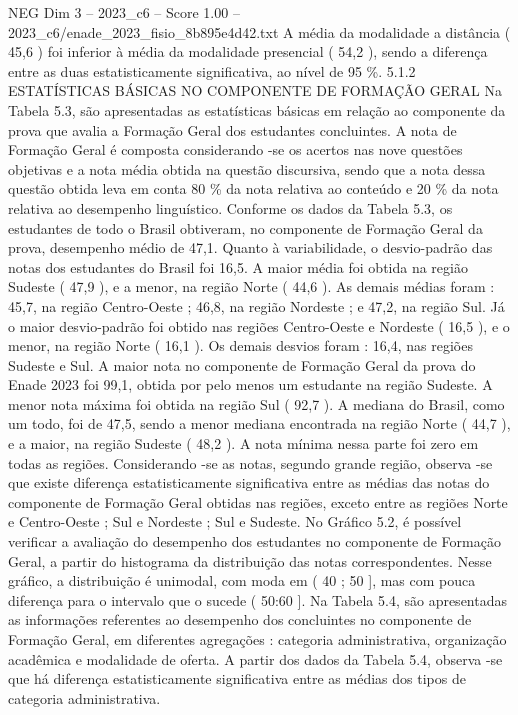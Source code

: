 \begin{textsample}{NEG Dim 3 – 2023\_c6 – Score 1.00 – 2023\_c6/enade\_2023\_fisio\_8b895e4d42.txt}
A média da modalidade a distância ( 45,6 ) foi inferior à média da modalidade presencial ( 54,2 ), sendo a diferença entre as duas estatisticamente significativa, ao nível de 95 \%. 5.1.2 ESTATÍSTICAS BÁSICAS NO COMPONENTE DE FORMAÇÃO GERAL Na Tabela 5.3, são apresentadas as estatísticas básicas em relação ao componente da prova que avalia a Formação Geral dos estudantes concluintes.
A nota de Formação Geral é composta considerando -se os acertos nas nove questões objetivas e a nota média obtida na questão discursiva, sendo que a nota dessa questão obtida leva em conta 80 \% da nota relativa ao conteúdo e 20 \% da nota relativa ao desempenho linguístico.
Conforme os dados da Tabela 5.3, os estudantes de todo o Brasil obtiveram, no componente de Formação Geral da prova, desempenho médio de 47,1.
Quanto à variabilidade, o desvio-padrão das notas dos estudantes do Brasil foi 16,5.
A maior média foi obtida na região Sudeste ( 47,9 ), e a menor, na região Norte ( 44,6 ).
As demais médias foram : 45,7, na região Centro-Oeste ; 46,8, na região Nordeste ; e 47,2, na região Sul.
Já o maior desvio-padrão foi obtido nas regiões Centro-Oeste e Nordeste ( 16,5 ), e o menor, na região Norte ( 16,1 ).
Os demais desvios foram : 16,4, nas regiões Sudeste e Sul.
A maior nota no componente de Formação Geral da prova do Enade 2023 foi 99,1, obtida por pelo menos um estudante na região Sudeste.
A menor nota máxima foi obtida na região Sul ( 92,7 ).
A mediana do Brasil, como um todo, foi de 47,5, sendo a menor mediana encontrada na região Norte ( 44,7 ), e a maior, na região Sudeste ( 48,2 ).
A nota mínima nessa parte foi zero em todas as regiões.
Considerando -se as notas, segundo grande região, observa -se que existe diferença estatisticamente significativa entre as médias das notas do componente de Formação Geral obtidas nas regiões, exceto entre as regiões Norte e Centro-Oeste ; Sul e Nordeste ; Sul e Sudeste.
No Gráfico 5.2, é possível verificar a avaliação do desempenho dos estudantes no componente de Formação Geral, a partir do histograma da distribuição das notas correspondentes.
Nesse gráfico, a distribuição é unimodal, com moda em ( 40 ; 50 ], mas com pouca diferença para o intervalo que o sucede ( 50:60 ].
Na Tabela 5.4, são apresentadas as informações referentes ao desempenho dos concluintes no componente de Formação Geral, em diferentes agregações : categoria administrativa, organização acadêmica e modalidade de oferta.
A partir dos dados da Tabela 5.4, observa -se que há diferença estatisticamente significativa entre as médias dos tipos de categoria administrativa.

\end{textsample}
